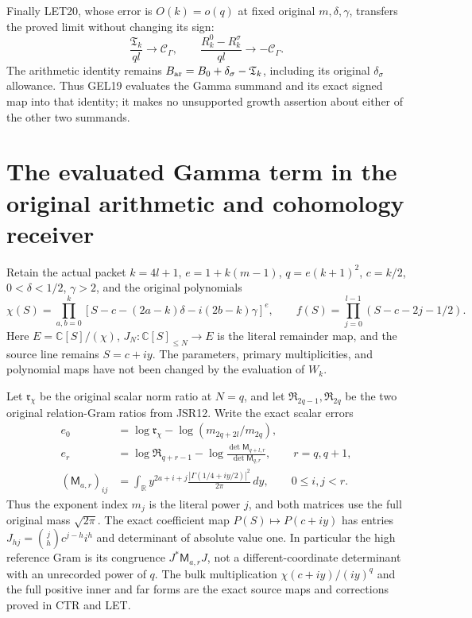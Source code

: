 \documentclass[11pt,a4paper]{article}
\begin{document}
Finally LET20, whose error is \(O(k)=o(q)\) at fixed original
\(m,\delta,\gamma\), transfers the proved limit without changing its sign:
\[
 \frac{\mathfrak T_k}{ql}\longrightarrow\mathcal C_\Gamma,
 \qquad
 \frac{R_k^0-R_k^\sigma}{ql}\longrightarrow-\mathcal C_\Gamma.
 \tag{GEL19}
\]
The arithmetic identity remains
\(B_{\rm ar}=B_0+\delta_\sigma-\mathfrak T_k\), including its original
\(\delta_\sigma\) allowance. Thus GEL19 evaluates the Gamma summand
and its exact signed map into that identity; it makes no unsupported
growth assertion about either of the other two summands.



\section{The evaluated Gamma term in the original arithmetic and cohomology receiver}
\label{sec:WGR}

Retain the actual packet $k=4l+1$, $e=1+k(m-1)$,
$q=e(k+1)^2$, $c=k/2$, $0<\delta<1/2$, $\gamma>2$,
and the original polynomials
\[
 \chi(S)=\prod_{a,b=0}^k
 [S-c-(2a-k)\delta-i(2b-k)\gamma]^e,\qquad
 f(S)=\prod_{j=0}^{l-1}(S-c-2j-1/2).
 \tag{WGR1}
\]
Here $E=\mathbb C[S]/(\chi)$, $J_N:\mathbb C[S]_{\le N}\to E$
is the literal remainder map, and the source line remains $S=c+iy$.
The parameters, primary multiplicities, and polynomial maps have not
been changed by the evaluation of $W_k$.

Let $\mathfrak r_\chi$ be the original scalar norm ratio at $N=q$,
and let $\mathfrak R_{2q-1},\mathfrak R_{2q}$ be the two original
relation-Gram ratios from JSR12. Write the exact scalar errors
\[
 \begin{aligned}
 e_0&=\log\mathfrak r_\chi-\log(m_{2q+2l}/m_{2q}),\\
 e_r&=\log\mathfrak R_{q+r-1}
       -\log\frac{\det\mathsf M_{q+l,r}}{\det\mathsf M_{q,r}},
       \qquad r=q,q+1,\\
 (\mathsf M_{a,r})_{ij}&=\int_{\mathbb R}y^{2a+i+j}
            \frac{|\Gamma(1/4+iy/2)|^2}{2\pi}\,dy,
            \qquad 0\le i,j<r .
 \end{aligned}\tag{WGR2}
\]
Thus the exponent index $m_j$ is the literal power $j$, and both
matrices use the full original mass $\sqrt{2\pi}$.
The exact coefficient map $P(S)\mapsto P(c+iy)$ has entries
$J_{hj}=\binom jh c^{j-h}i^h$ and determinant of absolute value one.
In particular the high reference Gram is its congruence
$J^*\mathsf M_{a,r}J$, not a different-coordinate determinant with
an unrecorded power of $q$. The bulk multiplication
$\chi(c+iy)/(iy)^q$ and the full positive inner and far forms are
the exact source maps and corrections proved in CTR and LET.
\end{document}
